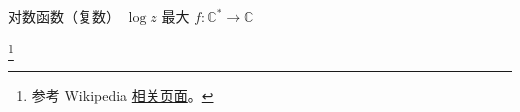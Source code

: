 

\begin{definition}{对数函数（复数）}
$\log z$ 最大 $f:\mathbb C^*\to \mathbb C$
\end{definition}

\footnote{参考 Wikipedia \href{https://en.wikipedia.org/wiki/Complex_logarithm}{相关页面}。}
